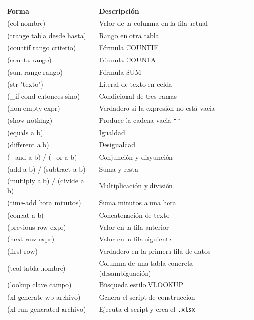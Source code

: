\documentclass[12pt,a4paper]{report}
\begin{document}
\begin{center}
\renewcommand{\arraystretch}{1.4}
\begin{tabular}{>{\ttfamily}p{5.6cm}p{7.4cm}}
\toprule
\textbf{Forma} & \textbf{Descripci\'on} \\
\midrule
(col nombre)              & Valor de la columna en la fila actual \\
(trange tabla desde hasta)& Rango en otra tabla \\
(countif rango criterio)  & F\'ormula COUNTIF \\
(counta rango)            & F\'ormula COUNTA \\
(sum-range rango)         & F\'ormula SUM \\
(str "texto")             & Literal de texto en celda \\
(\_if cond entonces sino) & Condicional de tres ramas \\
(non-empty expr)          & Verdadero si la expresi\'on no est\'a vac\'{\i}a \\
(show-nothing)            & Produce la cadena vac\'{\i}a \texttt{""} \\
(equals a b)              & Igualdad \\
(different a b)           & Desigualdad \\
(\_and a b) / (\_or a b)  & Conjunci\'on y disyunci\'on \\
(add a b) / (subtract a b)& Suma y resta \\
(multiply a b) / (divide a b) & Multiplicaci\'on y divisi\'on \\
(time-add hora minutos)   & Suma minutos a una hora \\
(concat a b)              & Concatenaci\'on de texto \\
(previous-row expr)       & Valor en la fila anterior \\
(next-row expr)           & Valor en la fila siguiente \\
(first-row)               & Verdadero en la primera fila de datos \\
(tcol tabla nombre)       & Columna de una tabla concreta (desambiguaci\'on) \\
(lookup clave campo)      & B\'usqueda estilo VLOOKUP \\
(xl-generate wb archivo)  & Genera el script de construcci\'on \\
(xl-run-generated archivo)& Ejecuta el script y crea el \texttt{.xlsx} \\
\bottomrule
\end{tabular}
\end{center}
\end{document}
